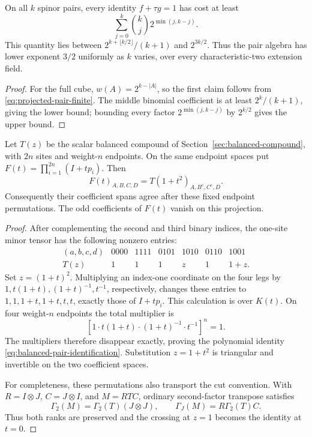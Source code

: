 \begin{corollary}
\label{thm:pair-product-barrier}
On all \(k\) spinor pairs, every identity \(f+\tau g=1\) has cost at least
\[
 \sum_{j=0}^k\binom kj2^{\min(j,k-j)}.
\]
This quantity lies between
\(2^{k+\lfloor k/2\rfloor}/(k+1)\) and \(2^{3k/2}\).
Thus the pair algebra has lower exponent \(3/2\) uniformly as \(k\)
varies, over every characteristic-two extension field.
\end{corollary}
\begin{proof}
For the full cube, \(w(A)=2^{k-|A|}\), so the first claim follows
from \eqref{eq:projected-pair-finite}. The middle binomial coefficient
is at least \(2^k/(k+1)\), giving the lower bound; bounding every
factor \(2^{\min(j,k-j)}\) by \(2^{k/2}\) gives the upper bound.
\end{proof}

\begin{proposition}
\label{prop:balanced-pair-identification}
Let \(T(z)\) be the scalar balanced compound of
Section~\ref{sec:balanced-compound}, with \(2n\) sites and
weight-\(n\) endpoints. On the same endpoint spaces put
\(F(t)=\prod_{i=1}^{2n}(I+t p_i)\). Then
\begin{equation}\label{eq:balanced-pair-identification}
 F(t)_{A,B,C,D}=T(1+t^2)_{A,B^{\mathrm c},C^{\mathrm c},D}.
\end{equation}
Consequently their coefficient spans agree after these fixed endpoint
permutations. The odd coefficients of \(F(t)\) vanish on this projection.
\end{proposition}
\begin{proof}
After complementing the second and third binary indices, the
one-site minor tensor has the following nonzero entries:
\[
\begin{array}{c|rrrrrr}
 (a,b,c,d)&0000&1111&0101&1010&0110&1001\\ \hline
 T(z)&1&1&1&z&1&1+z.
\end{array}
\]
Set \(z=(1+t)^2\). Multiplying an index-one coordinate on the four
legs by \(1,t(1+t),(1+t)^{-1},t^{-1}\), respectively, changes these
entries to \(1,1,1+t,1+t,t,t\), exactly those of \(I+t p_i\).
This calculation is over \(K(t)\). On four weight-\(n\) endpoints
the total multiplier is
\[
 [1\cdot t(1+t)\cdot(1+t)^{-1}\cdot t^{-1}]^n=1.
\]
The multipliers therefore disappear exactly, proving the polynomial
identity \eqref{eq:balanced-pair-identification}.
Substitution \(z=1+t^2\) is triangular and invertible on the two
coefficient spaces.

For completeness, these permutations also transport the cut
convention. With \(R=I\otimes J\), \(C=J\otimes I\), and \(M=RTC\),
ordinary second-factor transpose satisfies
\[
 \Gamma_2(M)=\Gamma_2(T)(J\otimes J),
 \qquad \Gamma_J(M)=R\Gamma_2(T)C.
\]
Thus both ranks are preserved and the crossing at \(z=1\) becomes
the identity at \(t=0\).
\end{proof}

